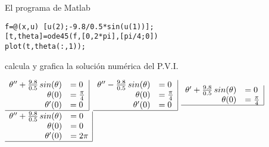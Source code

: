 \begin{pregunta}
\begin{cuerpo}
El programa de Matlab 
\begin{lstlisting}
f=@(x,u) [u(2);-9.8/0.5*sin(u(1))];
[t,theta]=ode45(f,[0,2*pi],[pi/4;0])
plot(t,theta(:,1));
\end{lstlisting}
calcula y grafica la soluci\'on num\'erica del P.V.I.\\
\end{cuerpo}

\begin{multicols}{2}
\begin{alternativas}
{
$\begin{array}{rl|}
\theta''+\frac{9.8}{0.5} \,sin(\theta)	&=0\\
\theta(0)	&=\frac{\pi}{4}\\
\theta'(0)	&=0\\ \hline
\end{array}$
}
{
$\begin{array}{rl|}
\theta''-\frac{9.8}{0.5} \,sin(\theta)	&=0\\
\theta(0)	&=\frac{\pi}{4}\\
\theta'(0)	&=0\\ \hline
\end{array}$						
}
{
$\begin{array}{rl|}
\theta'+\frac{9.8}{0.5} \,sin(\theta)	&=0\\
\theta(0)	&=\frac{\pi}{4}\\ \hline
\end{array}$						
}
{
$\begin{array}{rl|}
\theta''+\frac{9.8}{0.5} \,sin(\theta)	&=0\\
\theta(0)	&=0\\
\theta'(0)	&=2\pi\\ \hline
\end{array}$								
}
\end{alternativas}
\end{multicols}
\justificacion{0cm}
\end{pregunta}